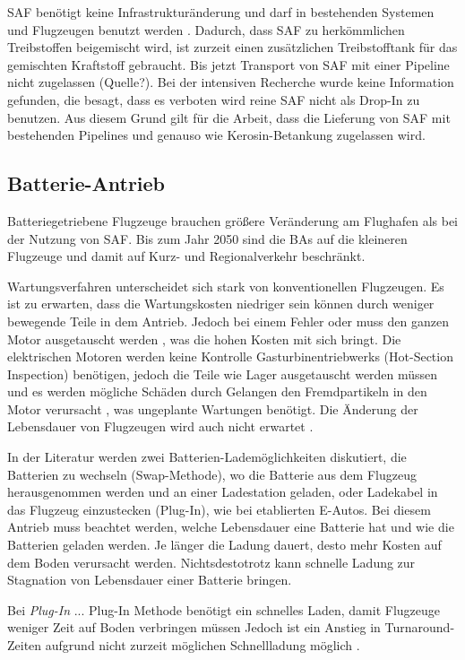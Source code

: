 SAF benötigt keine Infrastrukturänderung und darf in bestehenden Systemen und Flugzeugen benutzt werden \cite{dalmia2022powering}.
Dadurch, dass SAF zu herkömmlichen Treibstoffen beigemischt wird, ist zurzeit einen zusätzlichen Treibstofftank 
für das gemischten Kraftstoff gebraucht. Bis jetzt Transport von SAF mit einer Pipeline nicht zugelassen (Quelle?).
Bei der intensiven Recherche wurde keine Information gefunden, die besagt, dass es verboten wird reine SAF nicht als
Drop-In zu benutzen. Aus diesem Grund gilt für die Arbeit, dass die Lieferung von SAF mit bestehenden Pipelines 
und genauso wie Kerosin-Betankung zugelassen wird.

\subsection{Batterie-Antrieb}
Batteriegetriebene Flugzeuge brauchen größere Veränderung am Flughafen als bei der Nutzung von SAF.
Bis zum Jahr 2050 sind die BAs auf die kleineren Flugzeuge und damit auf Kurz- und Regionalverkehr beschränkt. 

Wartungsverfahren unterscheidet sich stark von konventionellen Flugzeugen. 
Es ist zu erwarten, dass die Wartungskosten niedriger sein können durch weniger bewegende Teile in dem Antrieb. 
Jedoch bei einem Fehler oder  muss den ganzen Motor ausgetauscht werden \cite{dalmia2022powering}, 
was die hohen Kosten mit sich bringt.
%
Die elektrischen Motoren werden keine Kontrolle Gasturbinentriebwerks (Hot-Section Inspection) benötigen, 
jedoch die Teile wie Lager ausgetauscht werden müssen und 
es werden mögliche Schäden durch Gelangen den Fremdpartikeln in den Motor verursacht \cite{reimers2018introduction}, was ungeplante
Wartungen benötigt.
Die Änderung der Lebensdauer von Flugzeugen wird auch nicht erwartet \cite{reimers2018introduction}.

In der Literatur werden zwei Batterien-Lademöglichkeiten diskutiert, die Batterien zu wechseln (Swap-Methode), 
wo die Batterie aus dem Flugzeug herausgenommen werden und 
an einer Ladestation geladen, oder Ladekabel in das Flugzeug einzustecken (Plug-In), wie bei etablierten E-Autos.
%
Bei diesem Antrieb muss beachtet werden, welche Lebensdauer eine Batterie hat und wie die Batterien geladen werden. 
Je länger die Ladung dauert, desto mehr Kosten auf dem Boden verursacht werden. Nichtsdestotrotz kann schnelle Ladung 
zur Stagnation von Lebensdauer einer Batterie bringen.

Bei \textit{Plug-In} ...
Plug-In Methode benötigt ein schnelles Laden, damit Flugzeuge weniger Zeit auf Boden verbringen müssen
Jedoch ist ein Anstieg in Turnaround-Zeiten aufgrund nicht zurzeit möglichen Schnellladung möglich \cite{avogadro2024demystifying}.

